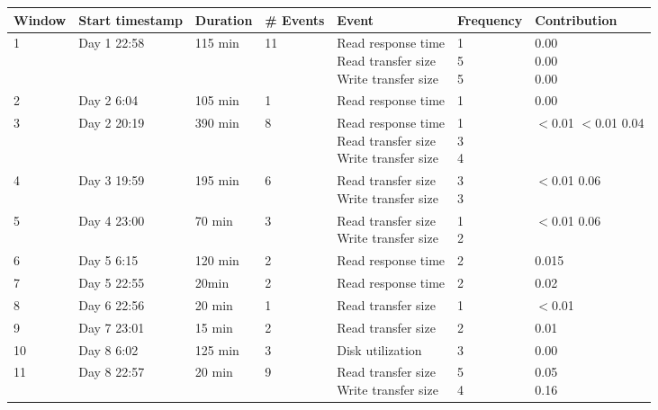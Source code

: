 \documentclass[letterpaper]{article} %
\begin{document}
\begin{table}
\centering
\begin{tabular}{| l | l | l | l | l | l | l |}
\hline
\textbf{Window} & \textbf{Start timestamp} & \textbf{Duration} & \textbf{\# Events} &\textbf{Event} & \textbf{Frequency} & \textbf{Contribution} \\
\hline
1 & Day 1 22:58 & 115 min & 11& \shortstack[l]{Read response time \\Read transfer size \\Write transfer size} & \shortstack{1 \\ 5 \\ 5} & \shortstack{0.00\\0.00\\0.00} \\
\hline
2 & Day 2 6:04 &105 min & 1& Read response time & 1 & 0.00 \\
\hline
3 & Day 2 20:19&390 min&8& \shortstack[l]{Read response time \\Read transfer size \\Write transfer size} & \shortstack{1 \\ 3 \\ 4} & \shortstack{$<$0.01\\$<$0.01\\0.04}\\
\hline
4 & Day 3 19:59& 195 min &6& \shortstack[l]{Read transfer size \\Write transfer size} & \shortstack{3\\3} & \shortstack{$<$0.01\\0.06} \\
\hline
5 & Day 4 23:00 & 70 min&3& \shortstack[l]{Read transfer size\\Write transfer size}& \shortstack{1\\2}&\shortstack{$<$0.01\\0.06}\\
\hline
6 & Day 5 6:15 & 120 min &2& Read response time & 2& 0.015\\
\hline
7 & Day 5 22:55 & 20min &2& Read response time & 2 & 0.02 \\
\hline
8 & Day 6 22:56 & 20 min &1& Read transfer size & 1 & $<$0.01\\
\hline
9 & Day 7 23:01 & 15 min &2& Read transfer size & 2 & 0.01\\
\hline
10 & Day 8 6:02 & 125 min &3& Disk utilization & 3 & 0.00 \\
\hline
11 & Day 8 22:57 & 20 min &9& \shortstack[l]{Read transfer size \\Write transfer size}& \shortstack{5\\4} & \shortstack{0.05\\0.16} \\

\end{tabular}
\end{table}
\end{document}
